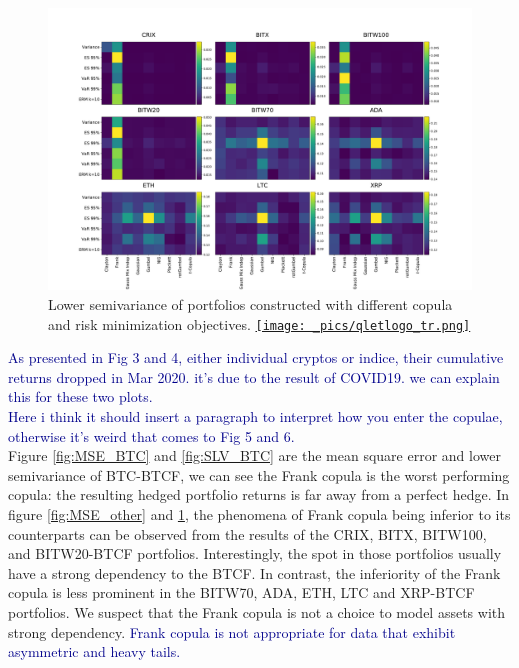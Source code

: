 \begin{figure}[th]
    \centering
    \includegraphics[width=\textwidth]{_pics/semiLowerVariance_other.pdf}
  \caption{Lower semivariance of portfolios constructed with different copula and risk minimization objectives.
  \href{http://www.quantlet.com/}{\texttt{[image: \_pics/qletlogo\_tr.png]}} }
\label{fig:SLV_other}
\end{figure}

\textcolor{darkblue}{As presented in Fig 3 and 4, either individual cryptos or indice, their cumulative returns dropped in Mar 2020. it's due to the result of COVID19. we can explain this for these two plots.}\\
\textcolor{darkblue}{Here i think it should insert a paragraph to interpret how you enter the copulae, otherwise it's weird that comes to Fig 5 and 6.}\\

Figure \ref{fig:MSE_BTC} and \ref{fig:SLV_BTC} are the mean square error and lower semivariance of BTC-BTCF, we can see the Frank copula is the worst performing copula:
the resulting hedged portfolio returns is far away from a perfect hedge.
In figure \ref{fig:MSE_other} and \ref{fig:SLV_other}, the phenomena of Frank copula being inferior to its counterparts can be observed from the results of the CRIX, BITX, BITW100, and BITW20-BTCF portfolios.
Interestingly, the spot in those portfolios usually have a strong dependency to the BTCF.
In contrast, the inferiority of the Frank copula is less prominent in the BITW70, ADA, ETH, LTC and XRP-BTCF portfolios.
We suspect that the Frank copula is not a choice to model assets with strong dependency. \textcolor{darkblue}{Frank copula is not appropriate for data that exhibit asymmetric and heavy tails.}  \medskip

